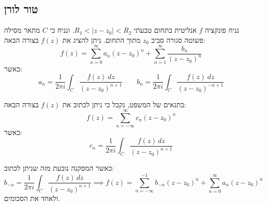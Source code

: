 \documentclass{tstextbook}
\begin{document}
\subsection{טור לורן}

\begin{theorem}[לורן]
נניח פונקציה \(f\) אנליטית בתחום טבעתי \(R_{1} < |z-z_{0}|< R_{2}\). ונניח כי \(C\) מתאר מסילה פשוטה סגורה סביב \(z_{0}\) מתוך התחום. ניתן להציג את \(f(z)\) בצורה הבאה:
$$f(z)=\sum_{n=0}^{\infty}a_{n}(z-z_{0})^{n}+\sum_{n=1}^{\infty}\frac{b_{n}}{(z-z_{0})^{n}}$$
כאשר:
$$a_{n}={\frac{1}{2\pi i}}\int_{C}{\frac{f(z)\ d z}{(z-z_{0})^{n+1}}} \qquad b_{n}=\frac{1}{2\pi i}\int_{C}\frac{f(z)\ d z}{(z-z_{0})^{-n+1}}$$

\end{theorem}
\begin{corollary}
בתנאים של המשפט, נקבל כי ניתן לכתוב את \(f(z)\) בצורה הבאה:
$$f(z)=\sum_{n=-\infty}^{\infty}c_{n}(z-z_{0})^{n}$$
כאשר:
$$c_{n}=\frac{1}{2\pi i}\int_{C}\frac{f(z)\,d z}{(z-z_{0})^{n+1}}$$

\end{corollary}
כאשר המסקנה נובעת מזה שניתן לכתוב:
$$b_{-n}=\frac{1}{2\pi i}\int_{C}\frac{f(z)\,d z}{(z-z_{0})^{n+1}}\implies f(z)=\sum_{n=-\infty}^{-1}b_{-n}(z-z_{0})^{n}+\sum_{n=0}^{\infty}a_{n}(z-z_{0})^{n}$$
ולאחד את הסכומים.
\end{document}
